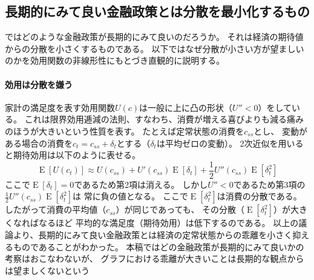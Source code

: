 \subsection{長期的にみて良い金融政策とは分散を最小化するもの}
\label{sec:chapter4_criteria_variance_minimization}
ではどのような金融政策が長期的にみて良いのだろうか。
それは経済の期待値からの分散を小さくするものである。
以下ではなぜ分散が小さい方が望ましいのかを効用関数の非線形性にもとづき直観的に説明する。

\paragraph{効用は分散を嫌う}
\label{sec:chapter4_criteria_variance_minimization_risk_aversion}
家計の満足度を表す効用関数\(U(c)\)は一般に上に凸の形状（\(U''<0\)）をしている。
これは限界効用逓減の法則、すなわち、消費が増える喜びよりも減る痛みのほうが大きいという性質を表す。
たとえば定常状態の消費を\(c_{ss}\)とし、
変動がある場合の消費を\(c_t=c_{ss}+\delta_t\)とする（\(\delta_t\)は平均ゼロの変動）。
2次近似を用いると期待効用は以下のように表せる。
\begin{equation}
\label{form:chapter4_criteria_utility_approximation_eq}
    \operatorname{E}[U(c_t)]\approx U(c_{ss})+U'(c_{ss})\operatorname{E}[\delta_t]+\frac{1}{2}U''(c_{ss})\operatorname{E}[\delta_t^2]
\end{equation}
ここで\(\operatorname{E}[\delta_t]=0\)であるため第2項は消える。
しかし\(U''<0\)であるため第3項の\(\frac{1}{2}U''(c_{ss})\operatorname{E}[\delta_t^2]\)は
常に負の値となる。
ここで\(\operatorname{E}[\delta_t^2]\)は消費の分散である。
したがって消費の平均値（\(c_{ss}\)）が同じであっても、
その分散（\(\operatorname{E}[\delta_t^2]\)）が大きくなればなるほど
平均的な満足度（期待効用）は低下するのである。
以上の議論より、長期的にみて良い金融政策とは経済の定常状態からの乖離を小さく抑えるものであることがわかった。
本稿ではどの金融政策が長期的にみて良いかの考察はおこなわないが、
グラフにおける乖離が大きいことは長期的な観点からは望ましくないという